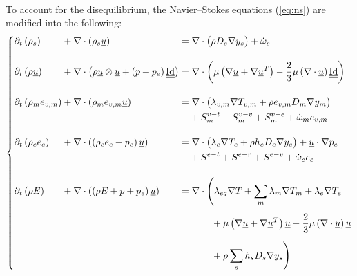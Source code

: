       \paragraph{}
      To account for the disequilibrium, the Navier--Stokes equations (\ref{eq:ns}) are modified into the following:
      \begin{equation}
        \left\{\begin{alignedat}{5}
          &\partial_t\left(  \rho_s  \right) &&+ \nabla\cdot\left(  \rho_s \vec{u}  \right) &&=
            \nabla\cdot\bigl( \rho D_s \nabla y_s\bigr) + \dot \omega_s \\[10pt]
          &\partial_t\left(  \rho \vec{u}  \right) &&+ \nabla\cdot\left(  \rho \vec{u} \otimes \vec{u}  +  \left(p + p_e\right) \mat{\operatorname{Id}}  \right) &&=
            \nabla\cdot\biggl(
              \mu \left(\nabla \vec{u} + \nabla \vec{u}^T\right)
              - \frac{2}{3} \mu \left(\nabla \cdot \vec{u} \right) \mat{\operatorname{Id}}
            \biggr) \\[10pt]
          &\partial_t\left(  \rho_m e_{v,m}  \right) &&+ \nabla\cdot\left(  \rho_m e_{v,m} \vec{u}  \right) &&=
            \nabla\cdot\bigl(
              \lambda_{v,m} \nabla T_{v,m}
              + \rho e_{v,m} D_m \nabla y_m
            \bigr) \\
            &&&&& \phantom{= {}} + S^{v-t}_m + S^{v-v}_m + S^{v-e}_m + \dot \omega_m e_{v,m} \\[10pt]
          &\partial_t\left(  \rho_e e_e  \right) &&+ \nabla\cdot\left(  \left(\rho_e e_e + p_e\right) \vec{u}  \right) &&=
            \nabla\cdot\bigl(
              \lambda_e \nabla T_e
              + \rho h_e D_e \nabla y_e
            \bigr)
            + \vec{u} \cdot \nabla p_e \\
            &&&&& \phantom{= {}} + S^{e-t} + S^{e-r} + S^{e-v} + \dot \omega_e e_e \\[10pt]
          &\partial_t\left(  \rho E  \right) &&+ \nabla\cdot\left(  \left(\rho E + p + p_e\right) \vec{u}  \right) &&=
            \nabla\cdot\Biggl(
              \lambda_{eq} \nabla T
              + \sum_m \lambda_m \nabla T_m
              + \lambda_e \nabla T_e \\
              &&&&& \phantom{=\nabla\cdot\Biggl(} + \mu \left(\nabla \vec{u} + \nabla \vec{u}^T\right) \vec{u} - \frac{2}{3} \mu \left(\nabla \cdot \vec{u}\right) \vec{u} \\
              &&&&& \phantom{=\nabla\cdot\Biggl(} + \rho \sum_s h_s D_s \nabla y_s
            \Biggr)
        \end{alignedat}\right.
      \end{equation}
